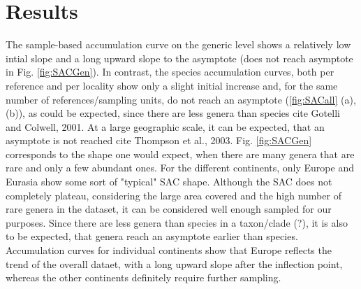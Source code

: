 \section{Results}



The sample-based accumulation curve on the generic level shows a relatively low intial slope and a long upward slope to the asymptote (does not reach asymptote in Fig. \ref{fig:SACGen}). In contrast, the species accumulation curves, both per reference and per locality show only a slight initial increase and, for the same number of references/sampling units, do not reach an asymptote (\ref{fig:SACall} (a), (b)), as could be expected, since there are less genera than species cite Gotelli and Colwell, 2001. At a large geographic scale, it can be expected, that an asymptote is not reached cite Thompson et al., 2003. Fig. \ref{fig:SACGen} corresponds to the shape one would expect, when there are many genera that are rare and only a few abundant ones. For the different continents, only Europe and Eurasia show some sort of "typical" SAC shape.
Although the SAC does not completely plateau, considering the large area covered and the high number of rare genera in the dataset, it can be considered well enough sampled for our purposes. Since there are less genera than species in a taxon/clade (?), it is also to be expected, that genera reach an asymptote earlier than species.
Accumulation curves for individual continents show that Europe reflects the trend of the overall dataet, with a long upward slope after the inflection point, whereas the other continents definitely require further sampling.


